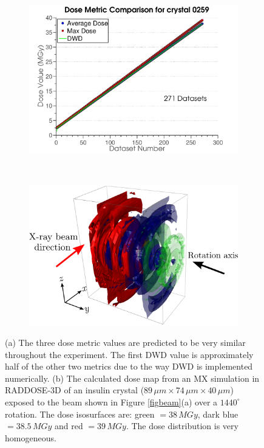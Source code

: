 \begin{figure}
        \centering
        \begin{subfigure}[b]{1\textwidth}
                \centering
                \includegraphics[width=\textwidth]{figures/dwd/metrics.pdf}
                \caption{}
                \label{fig:Metrics}
        \end{subfigure}
				\\
        \begin{subfigure}[b]{1\textwidth}
                \centering
                \includegraphics[width=\textwidth]{figures/dwd/raddose3d.png}
                \caption{}
                \label{fig:RADDOSE-3D dose contours uniform irradiation}
        \end{subfigure}
        \caption{(a) The three dose metric values are predicted to be very similar throughout the experiment. The first DWD value is approximately half of the other two metrics due to the way DWD is implemented numerically. (b) The calculated dose map from an MX simulation in RADDOSE-3D of an insulin crystal ($89\,\mu m \times 74\,\mu m \times 40\,\mu m$) exposed to the beam shown in Figure \ref{figbeam}(a) over a $1440^{\circ}$ rotation. The dose isosurfaces are: green $= 38\, MGy$, dark blue $= 38.5\, MGy$ and red $= 39\, MGy$. The dose distribution is very homogeneous.}
        \label{fig:Uniform}
\end{figure}

